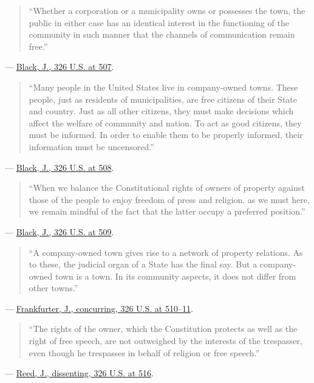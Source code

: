 \documentclass[12pt]{article}
\begin{document}
\begin{quote}
``Whether a corporation or a municipality owns or possesses the town, the public in either case has an identical interest in the functioning of the community in such manner that the channels of communication remain free.''
\end{quote}
\noindent --- \href{https://supreme.justia.com/cases/federal/us/326/501/}{Black, J., 326 U.S. at 507}.

\begin{quote}
``Many people in the United States live in company-owned towns. These people, just as residents of municipalities, are free citizens of their State and country. Just as all other citizens, they must make decisions which affect the welfare of community and nation. To act as good citizens, they must be informed. In order to enable them to be properly informed, their information must be uncensored.''
\end{quote}
\noindent --- \href{https://supreme.justia.com/cases/federal/us/326/501/}{Black, J., 326 U.S. at 508}.

\begin{quote}
``When we balance the Constitutional rights of owners of property against those of the people to enjoy freedom of press and religion, as we must here, we remain mindful of the fact that the latter occupy a preferred position.''
\end{quote}
\noindent --- \href{https://supreme.justia.com/cases/federal/us/326/501/}{Black, J., 326 U.S. at 509}.

\begin{quote}
``A company-owned town gives rise to a network of property relations. As to these, the judicial organ of a State has the final say. But a company-owned town is a town. In its community aspects, it does not differ from other towns.''
\end{quote}
\noindent --- \href{https://supreme.justia.com/cases/federal/us/326/501/}{Frankfurter, J., concurring, 326 U.S. at 510--11}.

\begin{quote}
``The rights of the owner, which the Constitution protects as well as the right of free speech, are not outweighed by the interests of the trespasser, even though he trespasses in behalf of religion or free speech.''
\end{quote}
\noindent --- \href{https://supreme.justia.com/cases/federal/us/326/501/}{Reed, J., dissenting, 326 U.S. at 516}.
\end{document}
